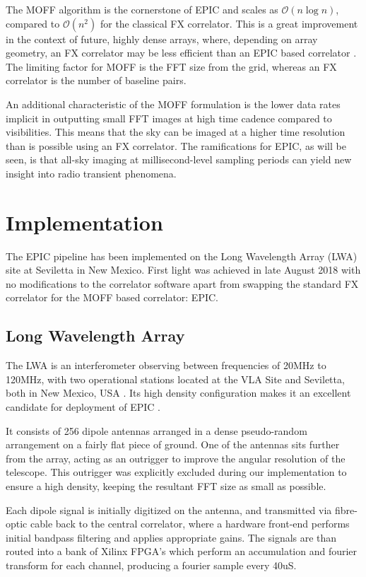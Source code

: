 \documentclass[bibliography=totocnumbered, twocolumn]{article}
\begin{document}
The MOFF algorithm is the cornerstone of EPIC and scales as
$\mathcal{O}(n\log{n})$, compared to $\mathcal{O}(n^2)$ for the
classical FX correlator. This is a great improvement in the
context of future, highly dense arrays, where, depending on
array geometry, an FX correlator may be less efficient than
an EPIC based correlator \cite{thyagarajan_generic_2017}.
The limiting factor for MOFF is the FFT size from the grid,
whereas an FX correlator is the number of baseline pairs.

An additional characteristic of the MOFF formulation is the
lower data rates implicit in outputting small FFT images at
high time cadence compared to visibilities. This means that
the sky can be imaged at a higher time resolution than is
possible using an FX correlator. The ramifications for EPIC,
as will be seen, is that all-sky imaging at millisecond-level
sampling periods can yield new insight into radio transient
phenomena.

\section{Implementation} \label{sec:implementation}

The EPIC pipeline has been implemented on the Long Wavelength Array (LWA)
site at Seviletta in New Mexico. First light was achieved in late
August 2018 with no modifications to the correlator software apart
from swapping the standard FX correlator for the MOFF based correlator: EPIC.


\subsection{Long Wavelength Array}

The LWA is an interferometer observing
between frequencies of 20MHz to 120MHz, with two operational stations
located at the VLA Site and Seviletta, both in New Mexico, USA \cite{henning_first_2010}\cite{taylor_first_2012}. Its
high density configuration makes it an excellent candidate for
deployment of EPIC .

It consists of 256 dipole antennas arranged in a dense pseudo-random
arrangement on a fairly flat piece of ground. One of the antennas
sits further from the array, acting as an outrigger to improve the
angular resolution of the telescope. This outrigger was explicitly
excluded during our implementation to ensure a high density, keeping
the resultant FFT size as small as possible.

Each dipole signal is initially digitized on the antenna, and transmitted via
fibre-optic cable back to the central correlator, where a hardware
front-end performs initial bandpass filtering and applies
appropriate gains. The signals are than routed into a bank of
Xilinx FPGA's which perform an accumulation and fourier transform
for each channel, producing a fourier sample every 40uS.
\end{document}
